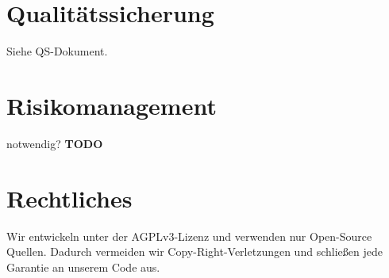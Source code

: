 \documentclass[accentcolor=tud0b,12pt,paper=a4]{tudreport}
\begin{document}
{\let\clearpage\relax	\chapter{Qualitätssicherung}}

	Siehe QS-Dokument.

	
{\let\clearpage\relax	\chapter{Risikomanagement}}

notwendig?  \textbf{{\large TODO}}
	
{\let\clearpage\relax	\chapter{Rechtliches}}
	
	Wir entwickeln unter der AGPLv3-Lizenz und verwenden nur Open-Source Quellen. Dadurch vermeiden wir Copy-Right-Verletzungen und schließen jede Garantie an unserem Code aus.
	
\end{document}
